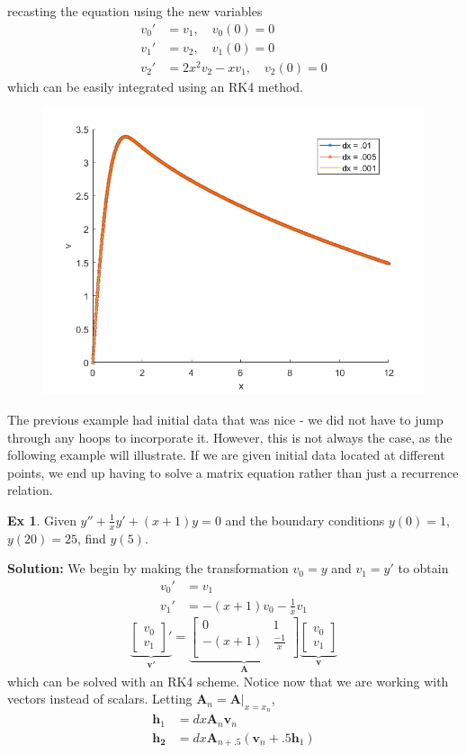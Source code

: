 \documentclass[]{article}
\theoremstyle{definition}
\newtheorem{exmp}{Ex}[section]
\numberwithin{equation}{section}
\begin{document}
recasting the equation using the new variables
\begin{align*}
	v_0' &= v_1, \quad v_0(0) = 0\\
	v_1' &= v_2, \quad v_1(0) = 0\\
	v_2' &= 2x^2v_2 - xv_1, \quad v_2(0) = 0
\end{align*}
which can be easily integrated using an RK4 method.
		\begin{center}
	\begin{figure}[H]
		\centering
		\includegraphics[scale=.7]{ex8_fig.png} 
		\label{fig:system1}
	\end{figure}
\end{center}
 The previous example had initial data that was nice - we did not have to jump through any hoops to incorporate it. However, this is not always the case, as the following example will illustrate. If we are given initial data located at different points, we end up having to solve a matrix equation rather than just a recurrence relation.
\begin{exmp}
	Given $y''+\frac{1}{x}y'+ (x+1)y = 0$ and the boundary conditions $y(0) = 1$, $y(20) = 25$, find $y(5)$.
\end{exmp}
\textbf{Solution:} We begin by making the transformation $v_0 = y$ and $v_1 = y'$ to obtain 
\begin{align*}
	v_0' &= v_1 \\
	v_1' &= -(x+1)v_0 - \frac{1}{x}v_1
\end{align*}
\[
	\underbrace{\begin{bmatrix}
	v_0 \\
	v_1
	\end{bmatrix}'}_{\mathbf{v'}} = \underbrace{\begin{bmatrix}
	0 & 1 \\
	-(x+1) & \frac{-1}{x} \\
	\end{bmatrix}}_{\mathbf{A}} \underbrace{\begin{bmatrix}
	v_0 \\
	v_1 
	\end{bmatrix}}_{\mathbf{v}}
\]
which can be solved with an RK4 scheme. Notice now that we are working with vectors instead of scalars. Letting $\mathbf{A}_n = \mathbf{A}|_{x=x_n}$,
\begin{align*}
	\mathbf{h}_1 &= dx \mathbf{A}_n \mathbf{v}_n \\
	\mathbf{h_2} &= dx\mathbf{A}_{n+.5} (\mathbf{v}_n + .5\mathbf{h}_1)
\end{align*}
\end{document}
